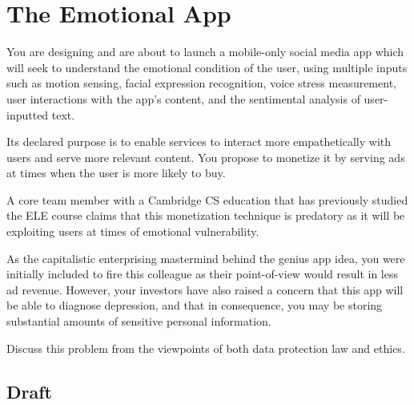\documentclass[10pt,\jkfside,a4paper]{article}
\begin{document}
\section{The Emotional App}

You are designing and are about to launch a mobile-only social media app
which will seek to understand the emotional condition of the user, using
multiple inputs such as motion sensing, facial expression recognition, voice
stress measurement, user interactions with the app's content, and the
sentimental analysis of user-inputted text.

Its declared purpose is to enable services to interact more empathetically
with users and serve more relevant content. You propose to monetize it by
serving ads at times when the user is more likely to buy.

A core team member with a Cambridge CS education that has previously studied
the ELE course claims that this monetization technique is predatory as it
will be exploiting users at times of emotional vulnerability.

As the capitalistic enterprising mastermind behind the genius app idea, you
were initially included to fire this colleague as their point-of-view would
result in less ad revenue. However, your investors have also raised a
concern that this app will be able to diagnose depression, and that in
consequence, you may be storing substantial amounts of sensitive personal
information.

Discuss this problem from the viewpoints of both data protection law and ethics.

\subsection{Draft}
\end{document}
